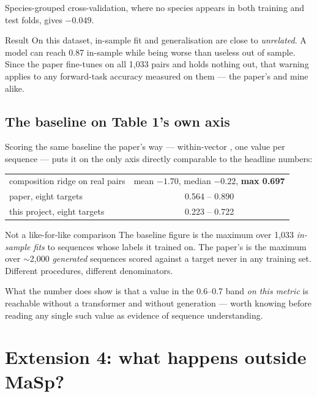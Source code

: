 Species-grouped cross-validation, where no species appears in both training and
test folds, gives $-0.049$.

\begin{goodbox}{Result}
On this dataset, in-sample fit and generalisation are close to \emph{unrelated}.
A model can reach 0.87 in-sample while being worse than useless out of sample.
Since the paper fine-tunes on all 1{,}033 pairs and holds nothing out, that
warning applies to any forward-task accuracy measured on them --- the paper's
and mine alike.
\end{goodbox}

\subsection{The baseline on Table 1's own axis}

Scoring the same baseline the paper's way --- within-vector \Rsq, one value per
sequence --- puts it on the only axis directly comparable to the headline
numbers:

\begin{center}
\small
\begin{tabular}{lc}
\toprule
composition ridge on real pairs & mean $-1.70$, median $-0.22$, \textbf{max 0.697} \\
paper, eight targets & 0.564 -- 0.890 \\
this project, eight targets & 0.223 -- 0.722 \\
\bottomrule
\end{tabular}
\end{center}

\begin{warnbox}{Not a like-for-like comparison}
The baseline figure is the maximum over 1{,}033 \emph{in-sample fits} to
sequences whose labels it trained on. The paper's is the maximum over $\sim$2{,}000
\emph{generated} sequences scored against a target never in any training set.
Different procedures, different denominators.

What the number does show is that a value in the 0.6--0.7 band \emph{on this
metric} is reachable without a transformer and without generation --- worth
knowing before reading any single such value as evidence of sequence
understanding.
\end{warnbox}

\section{Extension 4: what happens outside MaSp?}
\label{sec:nonmasp}

